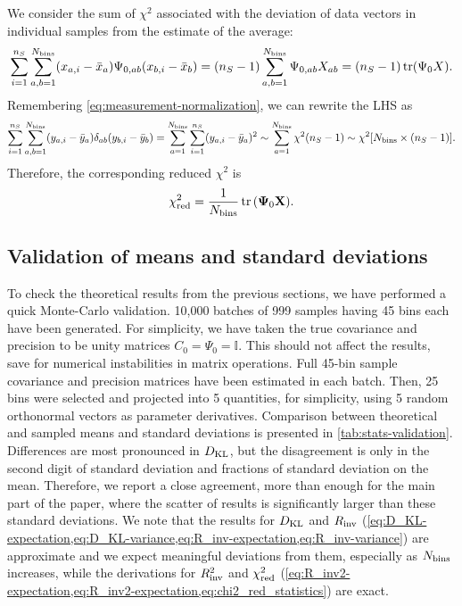 We consider the sum of $\chi^2$ associated with the deviation of data vectors in individual samples from the estimate of the average:
\begin{equation}
\sum_{i=1}^{n_S} \sum_{a,b=1}^{N_{\rm bins}} (x_{a,i} - \bar x_a) \Psi_{0,ab} (x_{b,i} - \bar x_b) = (n_S-1) \sum_{a,b=1}^{N_{\rm bins}} \Psi_{0,ab} X_{ab} = (n_S-1) \tr (\Psi_0 X).
\end{equation}
Remembering \cref{eq:measurement-normalization}, we can rewrite the LHS as
\begin{equation} \label{eq:chi2_red_statistics}
\sum_{i=1}^{n_S} \sum_{a,b=1}^{N_{\rm bins}} (y_{a,i} - \bar y_a) \delta_{ab} (y_{b,i} - \bar y_b) = \sum_{a=1}^{N_{\rm bins}} \sum_{i=1}^{n_S} (y_{a,i} - \bar y_a)^2 \sim \sum_{a=1}^{N_{\rm bins}} \chi^2(n_S-1) \sim \chi^2[N_{\rm bins} \times (n_S-1)].
\end{equation}
Therefore, the corresponding reduced $\chi^2$ is
\begin{equation}
\chi^2_{\rm red} = \frac1{N_{\rm bins}} \tr \Arg{{\bf \Psi}_0 {\bf X}}.
\end{equation}

\subsection{Validation of means and standard deviations}
\label{subsec:stats-validation}

To check the theoretical results from the previous sections, we have performed a quick Monte-Carlo validation.
10,000 batches of 999 samples having 45 bins each have been generated.
For simplicity, we have taken the true covariance and precision to be unity matrices $C_0=\Psi_0=\mathbb I$.
This should not affect the results, save for numerical instabilities in matrix operations.
Full 45-bin sample covariance and precision matrices have been estimated in each batch.
Then, 25 bins were selected and projected into 5 quantities, for simplicity, using 5 random orthonormal vectors as parameter derivatives.
Comparison between theoretical and sampled means and standard deviations is presented in \cref{tab:stats-validation}.
Differences are most pronounced in $D_{\rm KL}$, but the disagreement is only in the second digit of standard deviation and fractions of standard deviation on the mean.
Therefore, we report a close agreement, more than enough for the main part of the paper, where the scatter of \rascalc{} results is significantly larger than these standard deviations.
We note that the results for $D_{\rm KL}$ and $R_{\rm inv}$ (\cref{eq:D_KL-expectation,eq:D_KL-variance,eq:R_inv-expectation,eq:R_inv-variance}) are approximate and we expect meaningful deviations from them, especially as $N_{\rm bins}$ increases, while the derivations for $R_{\rm inv}^2$ and $\chi^2_{\rm red}$ (\cref{eq:R_inv2-expectation,eq:R_inv2-expectation,eq:chi2_red_statistics}) are exact.


